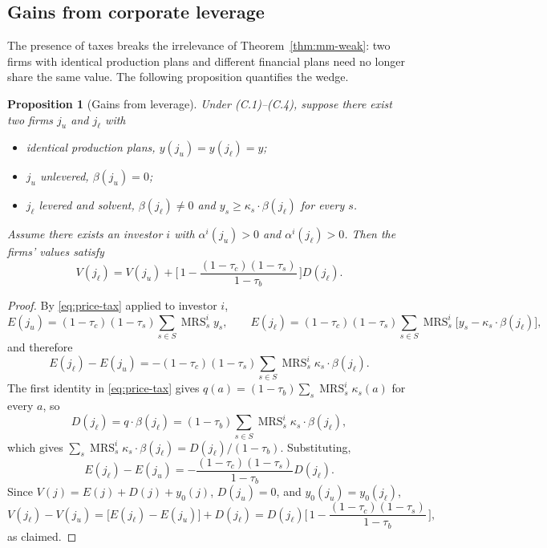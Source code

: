 \documentclass[11pt,a4paper,oneside]{book}
\def\geq{\geqslant}
\DeclareMathOperator{\MRS}{MRS}
\theoremstyle{plain}
\newtheorem{proposition}[theorem]{Proposition}
\theoremstyle{definition}
\theoremstyle{remark}
\numberwithin{equation}{chapter}
\begin{document}
\subsection{Gains from corporate leverage}

The presence of taxes breaks the irrelevance of Theorem~\ref{thm:mm-weak}: two firms with identical production plans and different financial plans need no longer share the same value.
The following proposition quantifies the wedge.

\begin{proposition}[Gains from leverage]\label{prop:gains-leverage}
Under \textup{(C.1)--(C.4)}, suppose there exist two firms $j_u$ and $j_\ell$ with
\begin{itemize}
  \item identical production plans, $y(j_u) = y(j_\ell) = y$;
  \item $j_u$ unlevered, $\beta(j_u) = 0$;
  \item $j_\ell$ levered and solvent, $\beta(j_\ell) \neq 0$ and $y_s \geq \kappa_s \cdot \beta(j_\ell)$ for every $s$.
\end{itemize}
Assume there exists an investor $i$ with $\alpha^i(j_u) > 0$ and $\alpha^i(j_\ell) > 0$.
Then the firms' values satisfy
\begin{equation}\label{eq:gains-leverage}
  V(j_\ell) = V(j_u) + \biggl[\, 1 - \frac{(1-\tau_c)(1-\tau_s)}{1-\tau_b} \,\biggr] D(j_\ell).
\end{equation}
\end{proposition}

\begin{proof}
By \eqref{eq:price-tax} applied to investor $i$,
\begin{equation*}
  E(j_u) = (1-\tau_c)(1-\tau_s) \sum_{s \in S} \MRS^i_s y_s,
  \qquad
  E(j_\ell) = (1-\tau_c)(1-\tau_s) \sum_{s \in S} \MRS^i_s \bigl[ y_s - \kappa_s \cdot \beta(j_\ell) \bigr],
\end{equation*}
and therefore
\begin{equation*}
  E(j_\ell) - E(j_u) = - (1-\tau_c)(1-\tau_s) \sum_{s \in S} \MRS^i_s \kappa_s \cdot \beta(j_\ell).
\end{equation*}
The first identity in \eqref{eq:price-tax} gives $q(a) = (1-\tau_b) \sum_s \MRS^i_s \kappa_s(a)$ for every $a$, so
\begin{equation*}
  D(j_\ell) = q \cdot \beta(j_\ell) = (1-\tau_b) \sum_{s \in S} \MRS^i_s \kappa_s \cdot \beta(j_\ell),
\end{equation*}
which gives $\sum_s \MRS^i_s \kappa_s \cdot \beta(j_\ell) = D(j_\ell)/(1-\tau_b)$.
Substituting,
\begin{equation*}
  E(j_\ell) - E(j_u) = - \frac{(1-\tau_c)(1-\tau_s)}{1-\tau_b} D(j_\ell).
\end{equation*}
Since $V(j) = E(j) + D(j) + y_0(j)$, $D(j_u) = 0$, and $y_0(j_u) = y_0(j_\ell)$,
\begin{equation*}
  V(j_\ell) - V(j_u)
  = \bigl[ E(j_\ell) - E(j_u) \bigr] + D(j_\ell)
  = D(j_\ell) \biggl[\, 1 - \frac{(1-\tau_c)(1-\tau_s)}{1-\tau_b} \,\biggr],
\end{equation*}
as claimed.
\end{proof}
\end{document}
